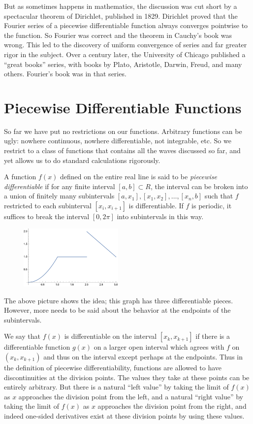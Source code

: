 \documentclass[11pt, oneside]{article}   	%
\begin{document}
But as sometimes happens in mathematics, the discussion was cut short by a spectacular theorem of Dirichlet, published in 1829. Dirichlet proved that the Fourier series of a piecewise differentiable function always converges pointwise to the function. So Fourier was correct and the theorem in Cauchy's book was wrong. This led to the discovery of uniform convergence of series and far greater rigor in the subject. Over a century later, the University of Chicago published a ``great books'' series, with books by Plato, Aristotle, Darwin, Freud, and many others. Fourier's book was in that series.

\section{Piecewise Differentiable Functions}

So far we have put no restrictions on our functions. Arbitrary functions can be ugly: nowhere continuous, nowhere differentiable, not integrable, etc. So we restrict to a class of functions that contains all the waves discussed so far, and yet allows us to do standard calculations rigorously.

A function $f(x)$ defined on the entire real line is said to be {\em piecewise differentiable} if for any finite interval $[a, b] \subset R$, the interval  can be broken into a union of finitely many subintervals $[a, x_1], [x_1, x_2], \ldots, [x_n, b]$ such that $f$ restricted to each subinterval $[x_i, x_{i + 1}]$ is differentiable. If $f$ is periodic,  it suffices to break the interval $[0, 2 \pi]$ into subintervals in this way. 

\begin{figure}[htbp] %
   \centering
   \includegraphics[width=2in]{Graphics/jumps}
\end{figure}

The above picture shows the idea; this graph has three differentiable pieces. However, more needs to be said about the behavior at the endpoints of the subintervals.

We say that $f(x)$ is differentiable on the interval $[x_k, x_{k + 1}]$ if there is a differentiable function $g(x)$ on a larger open interval which agrees with $f$ on $(x_k, x_{k + 1})$ and thus on the interval except perhaps at the endpoints. Thus in the definition of piecewise differentiability, functions are allowed to have discontinuities at the division points. The values they take at these points can be entirely arbitrary. But there is a natural ``left value'' by taking the limit of 
$f(x)$ as $x$ approaches the division point from the left, and a natural ``right value'' by taking the limit of $f(x)$ as $x$ approaches the division point from the right, and indeed one-sided derivatives exist at these division points by using these values. 
\end{document}
